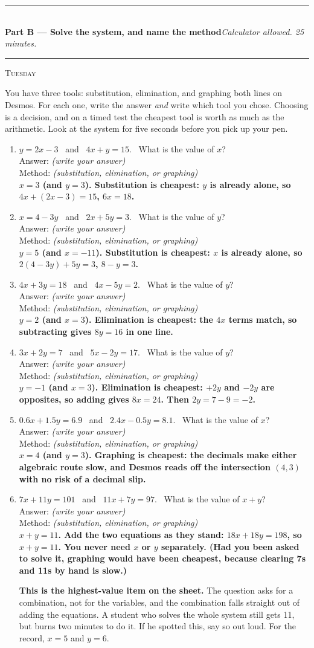 \documentclass[11pt,a4paper]{article}
\newif\ifANSWERS
\newcommand{\PartHead}[2]{%
  \vspace{6pt}
  {\color{navy}\rule{\textwidth}{0.8pt}}\\[2pt]
  {\large\bfseries\color{navy}#1}\hfill{\small\itshape #2}\\[-4pt]
  {\color{navy}\rule{\textwidth}{0.4pt}}
  \vspace{4pt}
}
\newcommand{\sitting}[1]{{\footnotesize\textsc{\color{navy}#1}}\par\vspace{2pt}}
\newcommand{\spr}{\\[3pt]\hspace*{6pt}Answer: \underline{\hspace{3.2cm}}\hfill{\footnotesize\itshape(write your answer)}}
\newcommand{\ans}[1]{\ {\color{keyred}\bfseries #1}}
\newcommand{\note}[1]{\par{\footnotesize\color{keyred}#1}}
\newcommand{\ans}[1]{}
\newcommand{\note}[1]{}
\newcommand{\method}{\\[3pt]\hspace*{6pt}Method: \underline{\hspace{4.6cm}}\hfill{\footnotesize\itshape(substitution, elimination, or graphing)}}
\begin{document}
\ifANSWERS\else\newpage\fi
\PartHead{Part B --- Solve the system, and name the method}{Calculator allowed. 25 minutes.}
\sitting{Tuesday}
You have three tools: substitution, elimination, and graphing both lines on Desmos.
For each one, write the answer \emph{and} write which tool you chose. Choosing is a
decision, and on a timed test the cheapest tool is worth as much as the arithmetic.
Look at the system for five seconds before you pick up your pen.

\begin{enumerate}[leftmargin=20pt,itemsep=9pt]
\item $y=2x-3$ \ and \ $4x+y=15$. \ What is the value of $x$? \spr\method
  \ans{\\ $x=3$ (and $y=3$). Substitution is cheapest: $y$ is already alone, so $4x+(2x-3)=15$, $6x=18$.}

\item $x=4-3y$ \ and \ $2x+5y=3$. \ What is the value of $y$? \spr\method
  \ans{\\ $y=5$ (and $x=-11$). Substitution is cheapest: $x$ is already alone, so $2(4-3y)+5y=3$, $8-y=3$.}

\item $4x+3y=18$ \ and \ $4x-5y=2$. \ What is the value of $y$? \spr\method
  \ans{\\ $y=2$ (and $x=3$). Elimination is cheapest: the $4x$ terms match, so subtracting gives $8y=16$ in one line.}

\item $3x+2y=7$ \ and \ $5x-2y=17$. \ What is the value of $y$? \spr\method
  \ans{\\ $y=-1$ (and $x=3$). Elimination is cheapest: $+2y$ and $-2y$ are opposites, so adding gives $8x=24$. Then $2y=7-9=-2$.}

\item $0.6x+1.5y=6.9$ \ and \ $2.4x-0.5y=8.1$. \ What is the value of $x$? \spr\method
  \ans{\\ $x=4$ (and $y=3$). Graphing is cheapest: the decimals make either algebraic route slow, and Desmos reads off the intersection $(4,3)$ with no risk of a decimal slip.}

\item $7x+11y=101$ \ and \ $11x+7y=97$. \ What is the value of $x+y$? \spr\method
  \ans{\\ $x+y=11$. Add the two equations as they stand: $18x+18y=198$, so $x+y=11$. You never need $x$ or $y$ separately. (Had you been asked to solve it, graphing would have been cheapest, because clearing 7s and 11s by hand is slow.)}
  \note{\textbf{This is the highest-value item on the sheet.} The question asks for a combination, not for the variables, and the combination falls straight out of adding the equations. A student who solves the whole system still gets 11, but burns two minutes to do it. If he spotted this, say so out loud. For the record, $x=5$ and $y=6$.}


\end{enumerate}
\end{document}
